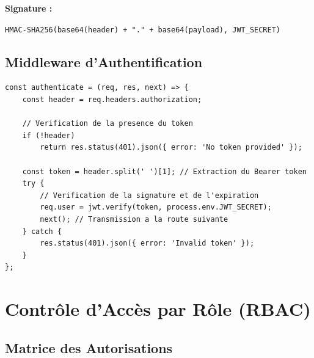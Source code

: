\documentclass[12pt,a4paper]{report}
\begin{document}
\textbf{Signature :}
\begin{center}
\texttt{HMAC-SHA256(base64(header) + "." + base64(payload), JWT\_SECRET)}
\end{center}

\subsection{Middleware d'Authentification}

\begin{lstlisting}[style=js, caption={auth.js — Middleware authenticate}]
const authenticate = (req, res, next) => {
    const header = req.headers.authorization;

    // Verification de la presence du token
    if (!header)
        return res.status(401).json({ error: 'No token provided' });

    const token = header.split(' ')[1]; // Extraction du Bearer token
    try {
        // Verification de la signature et de l'expiration
        req.user = jwt.verify(token, process.env.JWT_SECRET);
        next(); // Transmission a la route suivante
    } catch {
        res.status(401).json({ error: 'Invalid token' });
    }
};
\end{lstlisting}

\section{Contrôle d'Accès par Rôle (RBAC)}

\subsection{Matrice des Autorisations}
\end{document}
